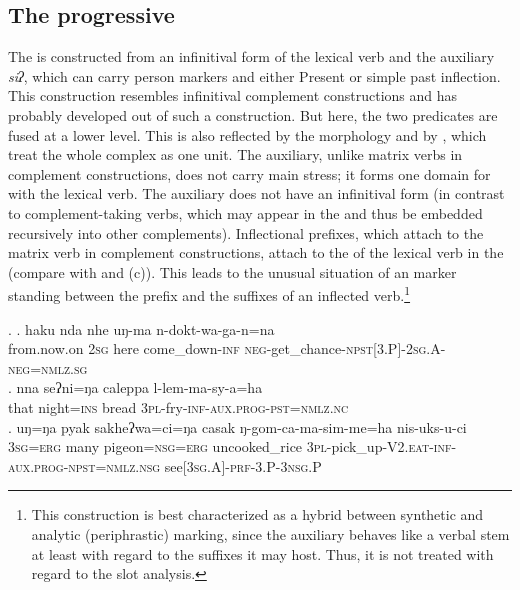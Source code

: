 		
\subsection{The  progressive}\label{progressive}

The   is constructed from an infinitival form of the lexical verb and the auxiliary \emph{siʔ}, which can carry person markers and  either Present or  simple past inflection. This construction resembles infinitival complement constructions and has probably developed out of such a construction. But here, the two predicates are fused at a lower level. This is also reflected by the morphology and by , which treat the whole complex as one unit. The auxiliary, unlike matrix verbs in complement constructions, does not carry main stress; it forms one domain for  with the lexical verb. The auxiliary does not have an infinitival form (in contrast to complement-taking verbs, which may appear in the  and thus be embedded recursively into other complements). Inflectional prefixes, which attach to the matrix verb in complement constructions, attach to the  of the lexical verb in the  (compare \Next[a] with \Next[b] and (c)). This leads to the unusual situation of an  marker standing between the prefix and the suffixes of an inflected verb.\footnote{This construction is best characterized as a hybrid between synthetic and analytic (periphrastic) marking, since the auxiliary behaves like a verbal stem at least with regard to the suffixes it may host. Thus, it is not treated with regard to the slot analysis.} 


\ex. \ag. haku nda nhe uŋ-ma n-dokt-wa-ga-n=na\\
		from.now.on {\scshape 2sg} here come\_down{\scshape -inf} {\scshape neg-}get\_chance{\scshape -npst[3.P]-2sg.A-neg=nmlz.sg}	\\
	 
 	\bg. nna  seʔni=ŋa       caleppa l-lem-ma-sy-a=ha\\ 
		that night{\scshape =ins} bread {\scshape 3pl-}fry{\scshape -inf-aux.prog-pst=nmlz.nc}\\
	  
	\bg. uŋ=ŋa   pyak sakheʔwa=ci=ŋa     casak ŋ-gom-ca-ma-sim-me=ha nis-uks-u-ci\\
 {\scshape 3sg=erg} many  pigeon{\scshape =nsg=erg} uncooked\_rice  {\scshape 3pl}-pick\_up{\scshape -V2.eat-inf-aux.prog-npst=nmlz.nsg} see{\scshape [3sg.A]-prf-3.P-3nsg.P}\\
 



